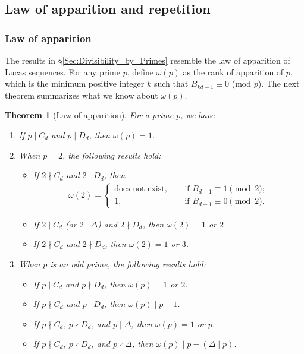 \documentclass[12pt]{article}
\theoremstyle{plain}
\newtheorem{theorem}{Theorem}
\theoremstyle{definition}
\theoremstyle{remark}
\begin{document}
\subsection{Law of apparition and repetition} \label{Sec:Law_of_Apparition_and_Repetition}

\subsubsection{Law of apparition}

The results in \S \ref{Sec:Divisibility_by_Primes} resemble the law of apparition of Lucas sequences. For any prime $ p $, define $ \omega(p) $ as the rank of apparition of $ p $, which is the minimum positive integer $ k $ such that $ B_{kd - 1} \equiv 0 $ (mod $ p $). The next theorem summarizes what we know about $ \omega (p) $. 
\begin{theorem}[Law of apparition] \label{Th:Law_of_Apparition} For a prime $ p $, we have 
\begin{enumerate}
	\item[(i)] If $ p \mid C_d $ and $ p \mid D_d $, then $ \omega (p) = 1 $.
	
	\item[(ii)] When $ p = 2 $, the following results hold: 
	\begin{itemize}
		\item If $ 2 \nmid C_d $ and $ 2 \mid D_d $, then
		\begin{align*}
			\omega (2) = \begin{cases} \text{does not exist}, \quad &\text{ if } B_{d - 1} \equiv 1 \pmod{2}; \\ 1, \quad &\text{ if } B_{d - 1} \equiv 0 \pmod{2}.
			\end{cases}
		\end{align*}
	
		\item If $ 2 \mid C_d $ (or $ 2 \mid \Delta $) and $ 2 \nmid D_d $, then $ \omega(2) = 1 $ or $ 2 $.
	
	\item If $ 2 \nmid C_d $ and $ 2 \nmid D_d $, then $ \omega(2) = 1 $ or $ 3 $.		
	\end{itemize}

	\item[(iii)] When $ p $ is an odd prime, the following results hold: 
	\begin{itemize}
		\item If $ p \mid C_d $ and $ p \nmid D_d $, then $ \omega(p) = 1 $ or $ 2 $.
		
		\item If $ p \nmid C_d $ and $ p \mid D_d $, then $ \omega(p) \mid p - 1 $.
		
		\item If $ p \nmid C_d $, $ p \nmid D_d $, and $ p \mid \Delta $, then $ \omega(p) = 1 $ or $ p $.
		
		\item If $ p \nmid C_d $, $ p \nmid D_d $, and $ p \nmid \Delta $, then $ \omega(p) \mid p - (\Delta \mid p) $.	
	\end{itemize}
\end{enumerate}	
\end{theorem}
\end{document}
